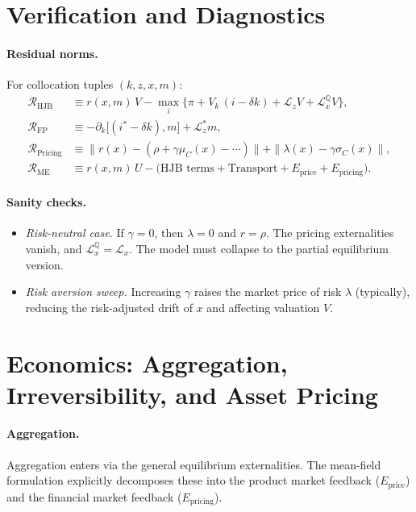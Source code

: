 \documentclass[11pt,letterpaper,oneside]{article}
\newcommand{\Lx}{\mathcal{L}_x}
\newcommand{\Lz}{\mathcal{L}_z}
\newcommand{\LxQ}{\mathcal{L}_x^{\mathbb{Q}}}
\newcommand{\Lzadj}{\mathcal{L}_z^{*}}
\begin{document}
\section{Verification and Diagnostics}\label{sec:verification}

\paragraph{Residual norms.}
For collocation tuples $(k,z,x,m)$:
\begin{align*}
\mathcal{R}_{\mathrm{HJB}} &\equiv r(x,m)\, V - \max_{i}\{\pi + V_k\,(i-\delta k) + \Lz V + \LxQ V\},\\
\mathcal{R}_{\mathrm{FP}}  &\equiv -\partial_k\big[(i^*-\delta k),m\big] + \Lzadj m,\\
\mathcal{R}_{\text{Pricing}} &\equiv \| r(x) - (\rho + \gamma \mu_C(x) - \cdots) \| + \| \lambda(x) - \gamma \sigma_C(x) \|,\\
\mathcal{R}_{\mathrm{ME}}  &\equiv r(x,m)\,U - \Big(\text{HJB terms}
  + \text{Transport}
  + E_{\text{price}} + E_{\text{pricing}}\Big).
\end{align*}

\paragraph{Sanity checks.}
\begin{itemize}[leftmargin=1.25em]
\item \emph{Risk-neutral case.} If $\gamma=0$, then $\lambda=0$ and $r=\rho$. The pricing externalities vanish, and $\LxQ=\Lx$. The model must collapse to the partial equilibrium version.
\item \emph{Risk aversion sweep.} Increasing $\gamma$ raises the market price of risk $\lambda$ (typically), reducing the risk-adjusted drift of $x$ and affecting valuation $V$.
\end{itemize}

\section{Economics: Aggregation, Irreversibility, and Asset Pricing}

\paragraph{Aggregation.}
Aggregation enters via the general equilibrium externalities. The mean-field formulation explicitly decomposes these into the product market feedback ($E_{\text{price}}$) and the financial market feedback ($E_{\text{pricing}}$).
\end{document}

